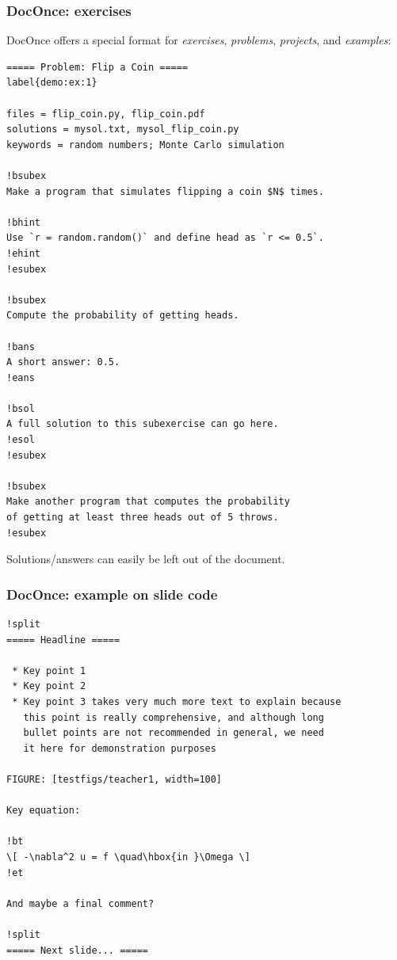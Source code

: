 \documentclass{beamer}
\begin{document}
\begin{frame}
\frametitle{DocOnce: exercises}

DocOnce offers a special format for \emph{exercises}, \emph{problems}, \emph{projects},
and \emph{examples}:
\begin{Verbatim}[numbers=none,fontsize=\fontsize{9pt}{9pt},baselinestretch=0.95]
===== Problem: Flip a Coin =====
label{demo:ex:1}

files = flip_coin.py, flip_coin.pdf
solutions = mysol.txt, mysol_flip_coin.py
keywords = random numbers; Monte Carlo simulation

!bsubex
Make a program that simulates flipping a coin $N$ times.

!bhint
Use `r = random.random()` and define head as `r <= 0.5`.
!ehint
!esubex

!bsubex
Compute the probability of getting heads.

!bans
A short answer: 0.5.
!eans

!bsol
A full solution to this subexercise can go here.
!esol
!esubex

!bsubex
Make another program that computes the probability
of getting at least three heads out of 5 throws.
!esubex

\end{Verbatim}

Solutions/answers can easily be left out of the document.
\end{frame}

\begin{frame}
\frametitle{DocOnce: example on slide code}

\begin{Verbatim}[numbers=none,fontsize=\fontsize{9pt}{9pt},baselinestretch=0.95]
!split
===== Headline =====

 * Key point 1
 * Key point 2
 * Key point 3 takes very much more text to explain because
   this point is really comprehensive, and although long
   bullet points are not recommended in general, we need
   it here for demonstration purposes

FIGURE: [testfigs/teacher1, width=100]

Key equation:

!bt
\[ -\nabla^2 u = f \quad\hbox{in }\Omega \]
!et

And maybe a final comment?

!split
===== Next slide... =====

\end{Verbatim}
\end{frame}
\end{document}
